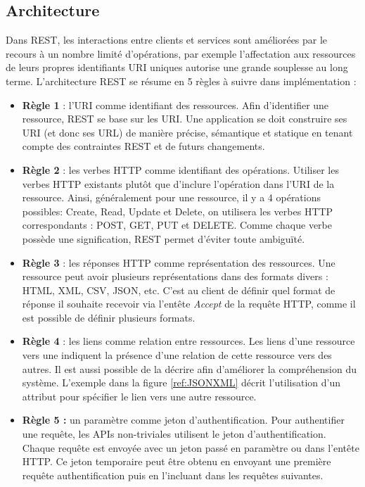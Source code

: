 \subsection{Architecture}
Dans REST, les interactions entre clients et services sont améliorées par le recours à un nombre limité d'opérations, par exemple l'affectation aux ressources de leurs propres identifiants URI uniques autorise une grande souplesse au long terme. 
L'architecture REST se résume en 5 règles à suivre dans implémentation \cite{refRegles} :
\begin{itemize}
	\item \textbf{Règle 1} : l'URI comme identifiant des ressources.\newline
	      Afin d'identifier une ressource, REST se base sur les URI. Une application se doit construire ses URI (et donc ses URL) de manière précise, sémantique et statique en tenant compte des contraintes REST et de futurs changements.
	\item \textbf{Règle 2} : les verbes HTTP comme identifiant des opérations.\newline
	      Utiliser les verbes HTTP existants plutôt que d'inclure l'opération dans l'URI de la ressource. Ainsi, généralement pour une ressource, il y a 4 opérations possibles: Create, Read, Update et Delete, on utilisera les verbes HTTP correspondants : POST, GET, PUT et DELETE.
	      Comme chaque verbe possède une signification, REST permet d'éviter toute ambiguïté.
	\item \textbf{Règle 3} : les réponses HTTP comme représentation des ressources.\newline
	      Une ressource peut avoir plusieurs représentations dans des formats divers : HTML, XML, CSV, JSON, etc. C'est au client de définir quel format de réponse il souhaite recevoir via l'entête \emph{Accept} de la requête HTTP, comme il est possible de définir plusieurs formats.
	\item \textbf{Règle 4} : les liens comme relation entre ressources.\newline
	Les liens d'une ressource vers une indiquent la présence d'une relation de cette ressource vers des autres. Il est aussi possible de la décrire afin d'améliorer la compréhension du système.
	L'exemple dans la figure \ref{ref:JSONXML} décrit l'utilisation d'un attribut pour spécifier le lien vers une autre ressource.
	
	\item \textbf{Règle 5 :} un paramètre comme jeton d'authentification.\newline
	      Pour authentifier une requête, les APIs non-triviales utilisent le jeton d'authentification. Chaque requête est envoyée avec un jeton passé en paramètre ou dans l'entête HTTP. Ce jeton temporaire peut être obtenu en envoyant une première requête authentification puis en l'incluant dans les requêtes suivantes.
\end{itemize}
